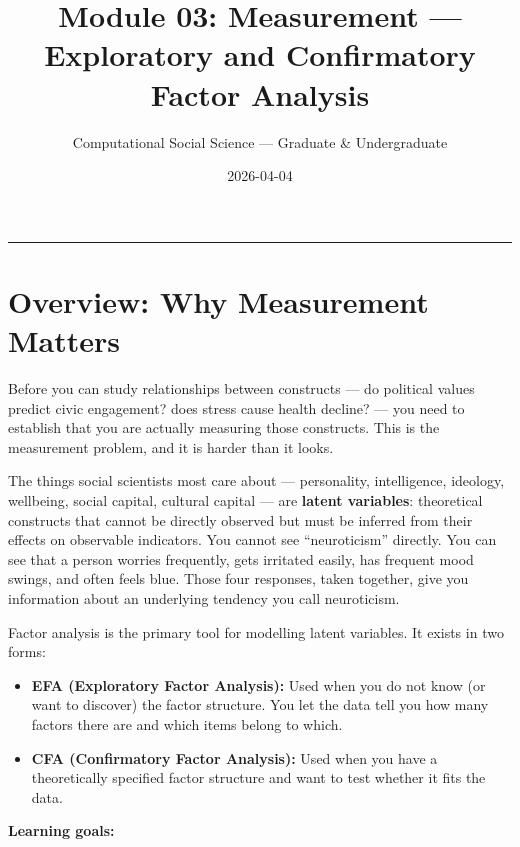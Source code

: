 \documentclass[
]{article}
\title{Module 03: Measurement --- Exploratory and Confirmatory Factor
Analysis}
\subtitle{Computational Social Science --- Graduate \& Undergraduate}
\author{}
\date{\vspace{-2.5em}2026-04-04}
\providecommand{\tightlist}{%
  \setlength{\itemsep}{0pt}\setlength{\parskip}{0pt}}
\begin{document}
\maketitle

{
\setcounter{tocdepth}{2}
\tableofcontents
}
\begin{center}\rule{0.5\linewidth}{0.5pt}\end{center}

\section{Overview: Why Measurement
Matters}\label{overview-why-measurement-matters}

Before you can study relationships between constructs --- do political
values predict civic engagement? does stress cause health decline? ---
you need to establish that you are actually measuring those constructs.
This is the measurement problem, and it is harder than it looks.

The things social scientists most care about --- personality,
intelligence, ideology, wellbeing, social capital, cultural capital ---
are \textbf{latent variables}: theoretical constructs that cannot be
directly observed but must be inferred from their effects on observable
indicators. You cannot see ``neuroticism'' directly. You can see that a
person worries frequently, gets irritated easily, has frequent mood
swings, and often feels blue. Those four responses, taken together, give
you information about an underlying tendency you call neuroticism.

Factor analysis is the primary tool for modelling latent variables. It
exists in two forms:

\begin{itemize}
\tightlist
\item
  \textbf{EFA (Exploratory Factor Analysis):} Used when you do not know
  (or want to discover) the factor structure. You let the data tell you
  how many factors there are and which items belong to which.
\item
  \textbf{CFA (Confirmatory Factor Analysis):} Used when you have a
  theoretically specified factor structure and want to test whether it
  fits the data.
\end{itemize}

\textbf{Learning goals:}
\end{document}
